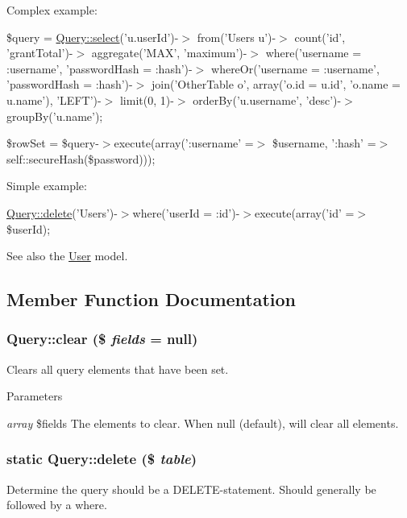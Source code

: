 Complex example:

\$query = \hyperlink{classQuery_af2be941b80c1e376f373ff3d25928a70}{Query::select}('u.userId')-\/$>$ from('Users u')-\/$>$ count('id', 'grantTotal')-\/$>$ aggregate('MAX', 'maximum')-\/$>$ where('username = :username', 'passwordHash = :hash')-\/$>$ whereOr('username = :username', 'passwordHash = :hash')-\/$>$ join('OtherTable o', array('o.id = u.id', 'o.name = u.name'), 'LEFT')-\/$>$ limit(0, 1)-\/$>$ orderBy('u.username', 'desc')-\/$>$ groupBy('u.name');

\$rowSet = \$query-\/$>$execute(array(':username' =$>$ \$username, ':hash' =$>$ self::secureHash(\$password)));

Simple example:

\hyperlink{classQuery_a5c5ec3da901616c9b405b686d3d338ab}{Query::delete}('Users')-\/$>$where('userId = :id')-\/$>$execute(array('id' =$>$ \$userId);

See also the \hyperlink{classUser}{User} model. 

\subsection{Member Function Documentation}
\hypertarget{classQuery_af219d3aed5b3940b49d414d69bab501d}{
\subsubsection[{clear}]{\setlength{\rightskip}{0pt plus 5cm}Query::clear (\$ {\em fields} = {\ttfamily null})}}
\label{classQuery_af219d3aed5b3940b49d414d69bab501d}
Clears all query elements that have been set.


\begin{DoxyParams}{Parameters}
\item[{\em array}]\$fields The elements to clear. When null (default), will clear all elements. \end{DoxyParams}
\hypertarget{classQuery_a5c5ec3da901616c9b405b686d3d338ab}{
\subsubsection[{delete}]{\setlength{\rightskip}{0pt plus 5cm}static Query::delete (\$ {\em table})}}
\label{classQuery_a5c5ec3da901616c9b405b686d3d338ab}
Determine the query should be a DELETE-\/statement. Should generally be followed by a where.


